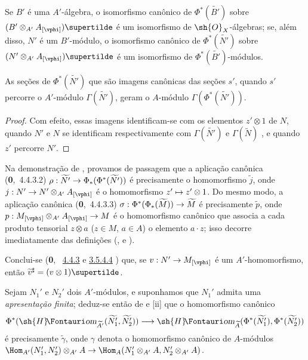\documentclass[oneside]{amsart}
\makeatletter
\newcommand{\ega@arrow}[2]{\mathchoice{#1}{#2}{#2}{#2}}
\let\ega@shortmapsto\mapsto
\renewcommand{\to}{\ega@arrow{\longrightarrow}{\rightarrow}}
\renewcommand{\mapsto}{\ega@arrow{\longmapsto}{\ega@shortmapsto}}
\newcommand*{\ega@sheafop}[3]{\sh{#1}#2\textup{\kern-2.2pt{\Fontauri\slshape #3}}}
\newcommand*{\shHom}{\ega@sheafop{H}{}{om}}
\newcommand{\oldpage}[2][]{{\marginnote{\normalfont\textbf{#1}~|~#2}}\ignorespaces}
\let\EGAOriginalLabel\label
\renewcommand{\label}[1]{\phantomsection\EGAOriginalLabel{#1}}
\newcommand{\EGAUnavailableHyperref}[2]{%
  \begingroup
  \let\@latex@warning\@gobble
  \let\@latex@warning@no@line\@gobble
  \let\G@refundefinedtrue\relax
  \hyperref[#1]{#2}%
  \endgroup
}
\makeatother
\begin{document}
Se $B'$ é uma $A'$-álgebra, o isomorfismo canônico de
$\Phi^*(\widetilde{B'})$ sobre
$(B'\otimes_{A'}A_{[\vphi]})\supertilde$ é um isomorfismo de
$\sh{O}_X$-álgebras; se, além disso, $N'$ é um $B'$-módulo, o isomorfismo
canônico de $\Phi^*(\widetilde{N'})$ sobre
$(N'\otimes_{A'}A_{[\vphi]})\supertilde$ é um isomorfismo de
$\Phi^*(\widetilde{B'})$-módulos.

\begin{corollary}[1.6.6]
\label{I.1.6.6}
As seções de $\Phi^*(\widetilde{N'})$ que são imagens canônicas das seções
$s'$, quando $s'$ percorre o $A'$-módulo $\Gamma(\widetilde{N'})$, geram o
$A$-módulo $\Gamma(\Phi^*(\widetilde{N'}))$.
\end{corollary}

\begin{proof}
Com efeito, essas imagens identificam-se com os elementos $z'\otimes 1$ de
$N$, quando $N'$ e $N$ se identificam respectivamente com
$\Gamma(\widetilde{N'})$ e $\Gamma(\widetilde{N})$ , e quando
$z'$ percorre $N'$.
\end{proof}

\begin{env}[1.6.7]
\label{I.1.6.7}
Na demonstração de , provamos de passagem que a aplicação
canônica (\textbf{0},~4.4.3.2)
$\rho:\widetilde{N'}\to\Phi_*(\Phi^*(\widetilde{N'}))$ é precisamente o
homomorfismo $\widetilde{j}$,
\oldpage[I]{96}
onde $j:N'\to N'\otimes_{A'}A_{[\vphi]}$ é o homomorfismo
$z'\mapsto z'\otimes 1$.
Do mesmo modo, a aplicação canônica (\textbf{0},~4.4.3.3)
$\sigma:\Phi^*(\Phi_*(\widetilde{M}))\to\widetilde{M}$ é precisamente
$\widetilde{p}$, onde
$p:M_{[\vphi]}\otimes_{A'}A_{[\vphi]}\to M$ é o homomorfismo canônico que
associa a cada produto tensorial $z\otimes a$ ($z\in M$, $a\in A$) o
elemento $a\cdot z$; isso decorre imediatamente das definições
(,  e ).

Conclui-se (\textbf{0},~\EGAUnavailableHyperref{0.4.4.3}{4.4.3} e
\EGAUnavailableHyperref{0.3.5.4.4}{3.5.4.4}) que, se
$v:N'\to M_{[\vphi]}$ é um $A'$-homomorfismo, então
$\widetilde{v}^\sharp=(v\otimes 1)\supertilde$.
\end{env}

\begin{env}[1.6.8]
\label{I.1.6.8}
Sejam $N_1'$ e $N_2'$ dois $A'$-módulos, e suponhamos que $N_1'$ admita uma
\emph{apresentação finita}; deduz-se então de  e
[ii] que o homomorfismo canônico 
\[
  \Phi^*(\shHom_{\widetilde{A'}}(\widetilde{N_1'},\widetilde{N_2'}))
  \to\shHom_{\widetilde{A}}(\Phi^*(\widetilde{N_1'}),\Phi^*(\widetilde{N_2'}))
\]
é precisamente $\widetilde{\gamma}$, onde $\gamma$ denota o homomorfismo
canônico de $A$-módulos
$\Hom_{A'}(N_1',N_2')\otimes_{A'}A\to
\Hom_A(N_1'\otimes_{A'}A,N_2'\otimes_{A'}A)$.
\end{env}
\end{document}
